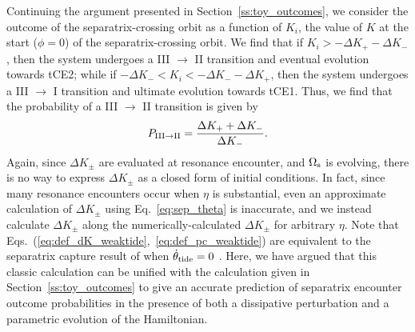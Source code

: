 \documentclass[
        fleqn,
        usenatbib,
    ]{mnras}
\begin{document}
Continuing the argument presented in Section~\ref{ss:toy_outcomes}, we consider
the outcome of the separatrix-crossing orbit as a function of $K_i$, the value
of $K$ at the start ($\phi = 0$) of the separatrix-crossing orbit. We find that
if $K_i > -\Delta K_+ - \Delta K_-$, then the system undergoes a III $\to$ II
transition and eventual evolution towards tCE2; while if $-\Delta K_- < K_i <
-\Delta K_- - \Delta K_+$, then the system undergoes a III $\to$ I transition
and ultimate evolution towards tCE1. Thus, we find that the probability of a III
$\to$ II transition is given by
\begin{equation}
    P_{\rm III \to II} = \frac{\Delta K_+ + \Delta K_-}{\Delta
        K_-}.\label{eq:def_pc_weaktide}
\end{equation}
Again, since $\Delta K_{\pm}$ are evaluated at resonance encounter, and
$\Omega_{\rm s}$ is evolving, there is no way to express $\Delta K_{\pm}$ as a
closed form of initial conditions. In fact, since many resonance encounters
occur when $\eta$ is substantial, even an approximate calculation of $\Delta
K_{\pm}$ using Eq.~\eqref{eq:sep_theta} is inaccurate, and we instead calculate
$\Delta K_{\pm}$ along the numerically-calculated $\Delta K_{\pm}$ for arbitrary
$\eta$. Note that Eqs.~(\ref{eq:def_dK_weaktide},~\ref{eq:def_pc_weaktide}) are
equivalent to the separatrix capture result of \citet{henrard1982} when
$\dot{\theta}_{\rm tide} = 0$ \citep{henrard1987}. Here, we have argued that
this classic calculation can be unified with the calculation given in
Section~\ref{ss:toy_outcomes} to give an accurate prediction of separatrix
encounter outcome probabilities in the presence of both a dissipative
perturbation and a parametric evolution of the Hamiltonian.
\end{document}
